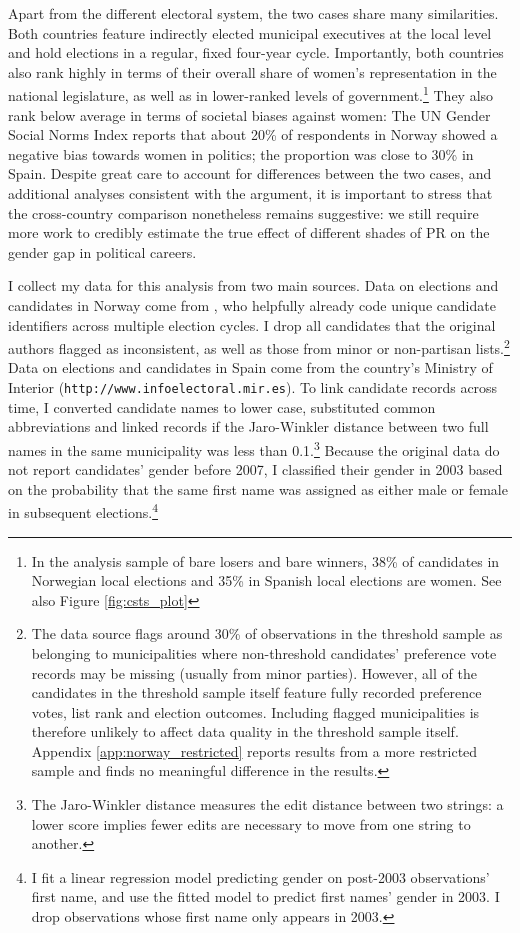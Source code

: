 \documentclass[12pt]{article}
\begin{document}
Apart from the different electoral system, the two cases share many similarities. Both countries feature indirectly elected municipal executives at the local level and hold elections in a regular, fixed four-year cycle. Importantly, both countries also rank highly in terms of their overall share of women's representation in the national legislature, as well as in lower-ranked levels of government.\footnote{In the analysis sample of bare losers and bare winners, 38\% of candidates in Norwegian local elections and 35\% in Spanish local elections are women. See also Figure \ref{fig:csts_plot}} They also rank below average in terms of societal biases against women: The UN Gender Social Norms Index reports that about 20\% of respondents in Norway showed a negative bias towards women in politics; the proportion was close to 30\% in Spain.
Despite great care to account for differences between the two cases, and additional analyses consistent with the argument, it is important to stress that the cross-country comparison nonetheless remains suggestive: we still require more work to credibly estimate the true effect of different shades of PR on the gender gap in political careers.

I collect my data for this analysis from two main sources. Data on elections and candidates in Norway come from \citet{fiva2020}, who helpfully already code unique candidate identifiers across multiple election cycles. I drop all candidates that the original authors flagged as inconsistent, as well as those from minor or non-partisan lists.\footnote{The data source flags around 30\% of observations in the threshold sample as belonging to municipalities where non-threshold candidates' preference vote records may be missing (usually from minor parties). However, all of the candidates in the threshold sample itself feature fully recorded preference votes, list rank and election outcomes. Including flagged municipalities is therefore unlikely to affect data quality in the threshold sample itself. Appendix \ref{app:norway_restricted} reports results from a more restricted sample and finds no meaningful difference in the results.} Data on elections and candidates in Spain come from the country's Ministry of Interior (\texttt{http://www.infoelectoral.mir.es}). To link candidate records across time, I converted candidate names to lower case, substituted common abbreviations and linked records if the Jaro-Winkler distance between two full names in the same municipality was less than 0.1.\footnote{The Jaro-Winkler distance measures the edit distance between two strings: a lower score implies fewer edits are necessary to move from one string to another.} Because the original data do not report candidates' gender before 2007, I classified their gender in 2003 based on the probability that the same first name was assigned as either male or female in subsequent elections.\footnote{I fit a linear regression model predicting gender on post-2003 observations' first name, and use the fitted model to predict first names' gender in 2003. I drop observations whose first name only appears in 2003.}
\end{document}
